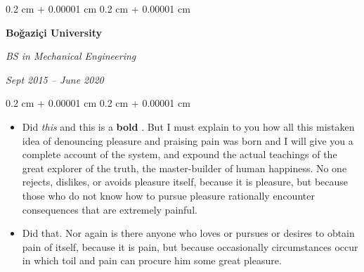 \documentclass[10pt, letterpaper]{article}
\newenvironment{highlights}{
    \begin{itemize}[
        topsep=0.10 cm,
        parsep=0.10 cm,
        partopsep=0pt,
        itemsep=0pt,
        leftmargin=0.4 cm + 10pt
    ]
}{
    \end{itemize}
} %
\newenvironment{onecolentry}{
    \begin{adjustwidth}{
        0.2 cm + 0.00001 cm
    }{
        0.2 cm + 0.00001 cm
    }
}{
    \end{adjustwidth}
} %
\newenvironment{twocolentry}[2][]{
    \onecolentry
    \def\secondColumn{#2}
    \setcolumnwidth{\fill, 4.5 cm}
    \begin{paracol}{2}
}{
    \switchcolumn \raggedleft \secondColumn
    \end{paracol}
    \endonecolentry
} %
\let\hrefWithoutArrow\href
\renewcommand{\href}[2]{\hrefWithoutArrow{#1}{\ifthenelse{\equal{#2}{}}{ }{#2 }\raisebox{.15ex}{\footnotesize \faExternalLink*}}}
\begin{document}
        \vspace{0.2 cm}

        \begin{twocolentry}{
            
            
        \textit{Sept 2015 – June 2020}}
            \textbf{Boğaziçi University}

            \textit{BS in Mechanical Engineering}
        \end{twocolentry}
        \vspace{0.10 cm}
        \begin{onecolentry}
            \begin{highlights}
                \item Did \textit{this} and this is a \textbf{bold} \href{https://example.com}{link}. But I must explain to you how all this mistaken idea of denouncing pleasure and praising pain was born and I will give you a complete account of the system, and expound the actual teachings of the great explorer of the truth, the master-builder of human happiness. No one rejects, dislikes, or avoids pleasure itself, because it is pleasure, but because those who do not know how to pursue pleasure rationally encounter consequences that are extremely painful.
                \item Did that. Nor again is there anyone who loves or pursues or desires to obtain pain of itself, because it is pain, but because occasionally circumstances occur in which toil and pain can procure him some great pleasure.
            \end{highlights}
        \end{onecolentry}


        \vspace{0.2 cm}
\end{document}
